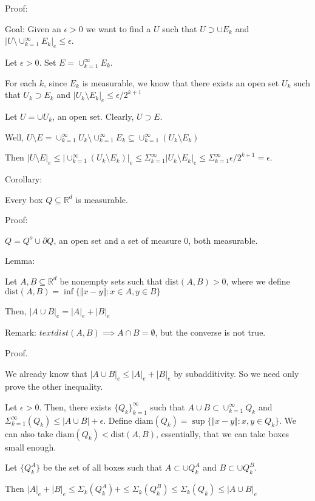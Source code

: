 \documentclass[10pt]{article}
\begin{document}
Proof:

Goal: Given an $\epsilon > 0$ we want to find a $U$ such that $U \supset \cup E_k$ and $|U \setminus \cup_{k=1}^\infty E_k|_e \leq \epsilon$.

Let $\epsilon > 0$. Set $E = \cup_{k=1}^\infty E_k$.

For each $k$, since $E_k$ is measurable, we know that there exists an open set $U_k$ such that $U_k \supset E_k$ and $|U_k\setminus E_k |_e \leq \epsilon/2^{k+1}$

Let $U = \cup U_k$, an open set. Clearly, $U \supset E$.

Well, $U \setminus E = \cup_{k=1}^\infty U_k \setminus \cup_{k=1}^\infty E_k \subseteq \cup_{k=1}^\infty(U_k \setminus E_k) $

Then $ |U \setminus E|_e \leq |\cup_{k=1}^\infty(U_k \setminus E_k) |_e \leq \Sigma_{k=1}^\infty |U_k \setminus E_k|_e \leq \Sigma_{k=1}^\infty \epsilon / 2^{k+1} = \epsilon$.

Corollary:

Every box $Q \subseteq \mathbb{R}^d$ is measurable.

Proof:

$Q = Q^o \cup \partial Q$, an open set and a set of measure 0, both measurable.

Lemma:

Let $A,B \subseteq \mathbb{R}^d$ be nonempty sets such that $\text{dist}(A,B) > 0$, where we define $\text{dist}(A,B) = \inf\{ \Vert x-y \Vert : x \in A, y \in B\}$

Then, $|A \cup B|_e =  |A|_e + |B|_e$

Remark: $ text{dist}(A,B) \implies A \cap B = \emptyset$, but the converse is not true.

Proof.

We already know that $|A \cup B|_e \leq |A|_e + |B|_e$ by subadditivity. So we need only prove the other inequality.

Let $\epsilon > 0$. Then, there exists $\{ Q_k \}_{k=1}^\infty$ such that $A \cup B \subset \cup_{k=1}^\infty Q_k$ and $\Sigma_{k=1}^\infty(Q_k) \leq | A \cup B| + \epsilon$. Define $\text{diam}(Q_k) = \sup \{ \Vert x - y \Vert : x,y \in Q_k \}$. We can also take $\text{diam}(Q_k) < \text{dist}(A,B)$, essentially, that we can take boxes small enough.

Let $\{ Q_k^A \}$ be the set of all boxes such that $A \subset \cup Q_k^A$ and $B \subset \cup Q_k^B$. 

Then $|A|_e + |B|_e \leq \Sigma_k (Q_k^A) + \leq \Sigma_k (Q_k^B) \leq \Sigma_k (Q_k) \leq |A \cup B|_e $
\end{document}
